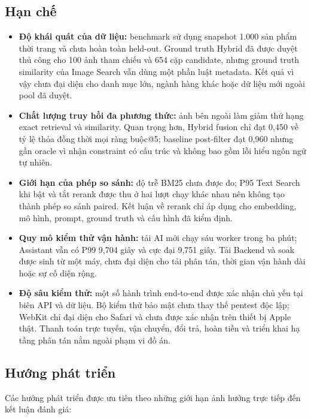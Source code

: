 \subsection{Hạn chế}

\begin{itemize}
    \item \textbf{Độ khái quát của dữ liệu:} benchmark sử dụng snapshot 1.000 sản phẩm thời trang và chưa hoàn toàn held-out. Ground truth Hybrid đã được duyệt thủ công cho 100 ảnh tham chiếu và 654 cặp candidate, nhưng ground truth similarity của Image Search vẫn dùng một phần luật metadata. Kết quả vì vậy chưa đại diện cho danh mục lớn, ngành hàng khác hoặc dữ liệu mới ngoài pool đã duyệt.

    \item \textbf{Chất lượng truy hồi đa phương thức:} ảnh bên ngoài làm giảm thứ hạng exact retrieval và similarity. Quan trọng hơn, Hybrid fusion chỉ đạt 0,450 về tỷ lệ thỏa đồng thời mọi ràng buộc@5; baseline post-filter đạt 0,960 nhưng gần oracle vì nhận constraint có cấu trúc và không bao gồm lỗi hiểu ngôn ngữ tự nhiên.

    \item \textbf{Giới hạn của phép so sánh:} độ trễ BM25 chưa được đo; P95 Text Search khi bật và tắt rerank được thu ở hai lượt chạy khác nhau nên không tạo thành phép so sánh paired. Kết luận về rerank chỉ áp dụng cho embedding, mô hình, prompt, ground truth và cấu hình đã kiểm định.

    \item \textbf{Quy mô kiểm thử vận hành:} tải AI mới chạy sáu worker trong ba phút; Assistant vẫn có P99 9,704 giây và cực đại 9,751 giây. Tải Backend và soak được sinh từ một máy, chưa đại diện cho tải phân tán, thời gian vận hành dài hoặc sự cố diện rộng.

    \item \textbf{Độ sâu kiểm thử:} một số hành trình end-to-end được xác nhận chủ yếu tại biên API và dữ liệu. Bộ kiểm thử bảo mật chưa thay thế pentest độc lập; WebKit chỉ đại diện cho Safari và chưa được xác nhận trên thiết bị Apple thật. Thanh toán trực tuyến, vận chuyển, đổi trả, hoàn tiền và triển khai hạ tầng phân tán nằm ngoài phạm vi đồ án.
\end{itemize}

\subsection{Hướng phát triển}

Các hướng phát triển được ưu tiên theo những giới hạn ảnh hưởng trực tiếp đến kết luận đánh giá:

